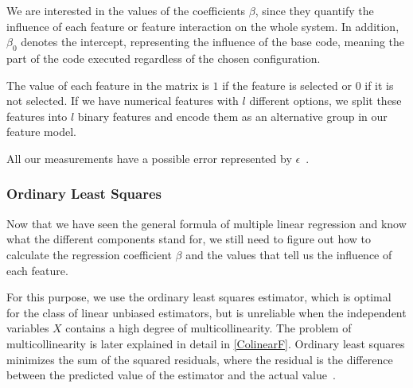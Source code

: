We are interested in the values of the coefficients $\beta$, since they quantify the influence of each feature or feature interaction on the whole system. 
In addition, $\beta_0$ denotes the intercept, representing the influence of the base code, 
meaning the part of the code executed regardless of the chosen configuration.

The value of each feature in the matrix is $1$ if the feature is selected or $0$ if it is not selected.  If we have numerical features with $l$ different options, 
we split these features into $l$ binary features and encode them as an alternative group in our feature model.

All our measurements have a possible error represented by $\epsilon$~\cite{Linear-Regression}.

\subsubsection{Ordinary Least Squares}\label{ch:OLS}
Now that we have seen the general formula of multiple linear regression and know what the different components stand for, we still need to figure out 
how to calculate the regression coefficient $\beta$ and the values that tell us the influence of each feature. 

For this purpose, we use the ordinary least squares estimator, which is optimal for the class of linear unbiased estimators, 
but is unreliable when the independent variables $X$ contains a high degree of multicollinearity.
The problem of multicollinearity is later explained in detail in \autoref{ColinearF}.
Ordinary least squares minimizes the sum of the squared residuals, where the residual is the difference between
the predicted value of the estimator and the actual value~\cite{Linear-Regression}.



